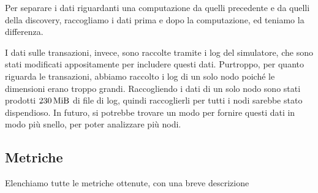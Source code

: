 \documentclass[12pt, a4paper]{article}
\begin{document}
Per separare i dati riguardanti una computazione da quelli precedente e da quelli della discovery, raccogliamo i dati prima e dopo la computazione, ed teniamo la differenza.

I dati sulle transazioni, invece, sono raccolte tramite i log del simulatore, che sono stati modificati appositamente per includere questi dati.
Purtroppo, per quanto riguarda le transazioni, abbiamo raccolto i log di un solo nodo poiché le dimensioni erano troppo grandi. Raccogliendo i dati di un solo nodo sono stati prodotti $\qty{230}{\mebi\byte}$ di file di log, quindi raccoglierli per tutti i nodi sarebbe stato dispendioso.
In futuro, si potrebbe trovare un modo per fornire questi dati in modo più snello, per poter analizzare più nodi.

\subsection{Metriche}

Elenchiamo tutte le metriche ottenute, con una breve descrizione
\end{document}

